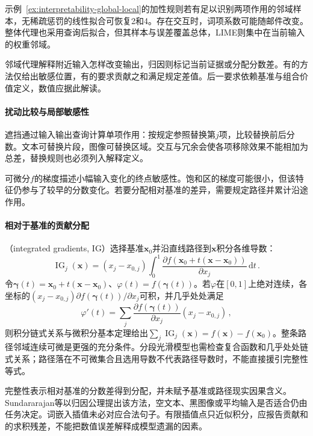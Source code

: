 示例~\ref{ex:interpretability-global-local}的加性规则若有足以识别两项作用的邻域样本，无稀疏惩罚的线性拟合可恢复2和4。存在交互时，词项系数可能随邮件改变。整体代理也采用查询后拟合，但其样本与误差覆盖总体，LIME则集中在当前输入的权重邻域。

邻域代理解释附近输入怎样改变输出，归因则标记当前证据或分配分数差。有的方法仅给出敏感位置，有的要求贡献之和满足规定差值。后一要求依赖基准与组合价值定义，数值应据此解读。

\paragraph{扰动比较与局部敏感性}

遮挡通过输入输出查询计算单项作用：按规定参照替换第$j$项，比较替换前后分数。文本可替换片段，图像可替换区域。交互与冗余会使各项移除效果不能相加为总差，替换规则也必须列入解释定义。

可微分$f$的梯度描述小幅输入变化的终点敏感性。饱和区的梯度可能很小，但该特征仍参与了较早的分数变化。若要分配相对基准的差异，需要规定路径并累计沿途作用。

\paragraph{相对于基准的贡献分配}
\label{sec:interpretability-local-attribution}

（integrated gradients, IG）选择基准$\bm x_0$并沿直线路径到$\bm x$积分各维导数：
\begin{equation}
 \operatorname{IG}_j(\bm{x})
 =(x_j-x_{0,j})\int_0^1
 \frac{\partial f(\bm{x}_0+t(\bm{x}-\bm{x}_0))}
      {\partial x_j}\,\mathrm dt\, .
 \label{eq:interpretability-ig}
\end{equation}
令$\bm\gamma(t)=\bm x_0+t(\bm x-\bm x_0)$、$\varphi(t)=f(\bm\gamma(t))$。若$\varphi$在$[0,1]$上绝对连续，各坐标的$(x_j-x_{0,j})\partial f(\bm\gamma(t))/\partial x_j$可积，并几乎处处满足
\[
 \varphi'(t)=
 \sum_j\frac{\partial f(\bm\gamma(t))}{\partial x_j}(x_j-x_{0,j})\, ,
\]
则积分链式关系与微积分基本定理给出$\sum_j\operatorname{IG}_j(\bm x)=f(\bm x)-f(\bm x_0)$。整条路径邻域连续可微是更强的充分条件。分段光滑模型也需检查复合函数和几乎处处链式关系；路径落在不可微集合且选用导数不代表路径导数时，不能直接援引完整性等式。

完整性表示相对基准的分数差得到分配，并未赋予基准或路径现实因果含义。Sundararajan等以归因公理提出该方法，空文本、黑图像或平均输入是否适合仍由任务决定。词嵌入插值未必对应合法句子。有限插值点只近似积分，应报告贡献和的求积残差，不能把数值误差解释成模型遗漏的因素。

